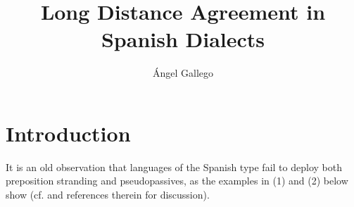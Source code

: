 \documentclass[output=paper]{langsci/langscibook}
\author{Ángel Gallego\affiliation{Universitat Autònoma de Barcelona}}
\title{Long Distance Agreement in Spanish Dialects}
\begin{document}
 

 

 

 

 

 

 

 

 

 

 


\section{Introduction}%

It is an old observation that languages of the Spanish type fail to deploy both preposition stranding and pseudopassives, as the examples in (1) and (2) below show (cf. \citealt{Law2006} and references therein for discussion). 

    \z
\end{document}
